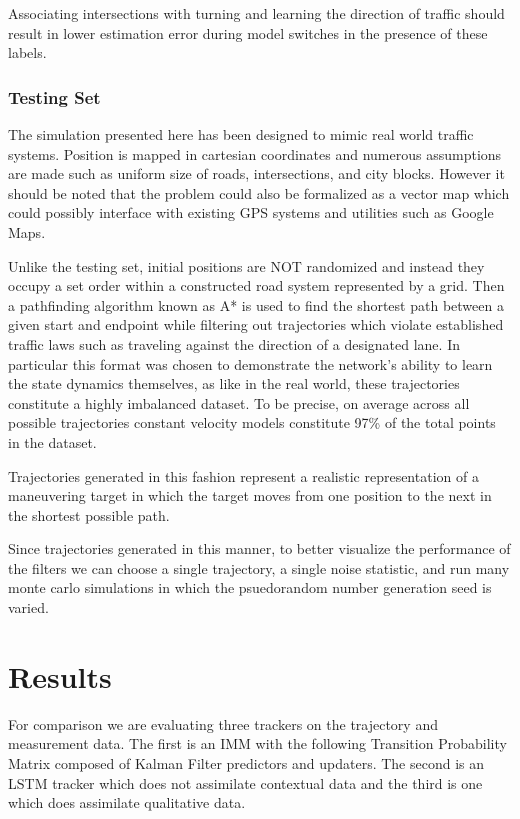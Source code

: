 \documentclass[twocolumn,letterpaper]{IEEEAerospaceCLS}  %
\begin{document}
Associating intersections with turning and learning the direction of traffic should result in lower estimation error during model switches in the presence of these labels.


\subsubsection{Testing Set}
The simulation presented here has been designed to mimic real world traffic systems. Position is mapped in cartesian coordinates and numerous assumptions are made such as uniform size of roads, intersections, and city blocks. However it should be noted that the problem could also be formalized as a vector map which could possibly interface with existing GPS systems and utilities such as Google Maps.

Unlike the testing set, initial positions are NOT randomized and instead they occupy a set order within a constructed road system represented by a grid. Then a pathfinding algorithm known as A* is used to find the shortest path between a given start and endpoint while filtering out trajectories which violate established traffic laws such as traveling against the direction of a designated lane. In particular this format was chosen to demonstrate the network's ability to learn the state dynamics themselves, as like in the real world, these trajectories constitute a highly imbalanced dataset. To be precise, on average across all possible trajectories constant velocity models constitute 97\% of the total points in the dataset.

Trajectories generated in this fashion represent a realistic representation of a maneuvering target in which the target moves from one position to the next in the shortest possible path.

Since trajectories generated in this manner, to better visualize the performance of the filters we can choose a single trajectory, a single noise statistic, and run many monte carlo simulations in which the psuedorandom number generation seed is varied.

\section{Results}

For comparison we are evaluating three trackers on the trajectory and measurement data. The first is an IMM with the following Transition Probability Matrix composed of Kalman Filter predictors and updaters. The second is an LSTM tracker which does not assimilate contextual data and the third is one which does assimilate qualitative data.
\end{document}
